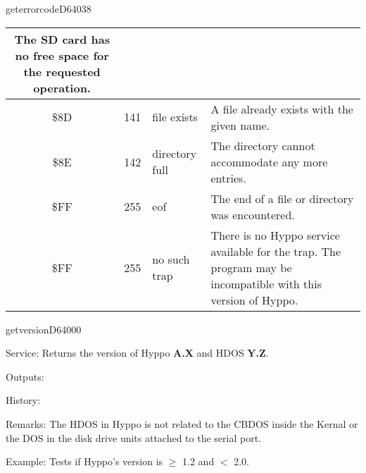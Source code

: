 \begin{hyppotrap}{geterrorcode}{D640}{38}
{\begin{longtable}{|c|r|l|p{8cm}|}
    The SD card has no free space for the requested operation.
    \\\hline
    \index{Hyppo Error Codes!\$8D}
    \$8D & 141 & file exists &
    A file already exists with the given name.
    \\\hline
    \index{Hyppo Error Codes!\$8E}
    \$8E & 142 & directory full &
    The directory cannot accommodate any more entries.
    \\\hline
    \index{Hyppo Error Codes!\$FF}
    \$FF & 255 & eof &
    The end of a file or directory was encountered.
    \\\hline
    \index{Hyppo Error Codes!\$FF}
    \$FF & 255 & no such trap &
    There is no Hyppo service available for the trap. The program may be
    incompatible with this version of Hyppo.
    \\\hline
  \end{longtable}
}
\end{hyppotrap}


\newpage
\begin{hyppotrap}{getversion}{D640}{00}
\item [Service:]
  Returns the version of Hyppo \textbf{A.X} and HDOS \textbf{Y.Z}.
\item [Outputs:]
\item [History:]
\item [Remarks:]
  The HDOS in Hyppo is not related to the CBDOS inside the Kernal or the
  DOS in the disk drive units attached to the serial port.
\item [Example:]
  Tests if Hyppo's version is $\geq$ 1.2 and $<$ 2.0.
\end{hyppotrap}


